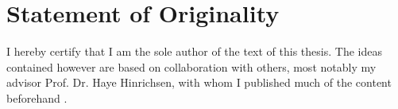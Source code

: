 \newpage

\section*{Statement of Originality}

I hereby certify that I am the sole author of the text of this thesis. The ideas contained however are based on collaboration with others, most notably my advisor Prof. Dr. Haye Hinrichsen, with whom I published much of the content beforehand \cite{thingie-paper, flow-paper}.